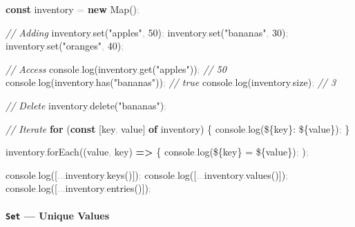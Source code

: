 \documentclass[
  justified,
  openright,
]{tufte-book}
\let\subsection\paragraph
\let\paragraph\paragraph
\newcommand{\KeywordTok}[1]{\textcolor{CodeKeyword}{\textbf{#1}}}  %
\newcommand{\StringTok}[1]{\textcolor{CodeString}{#1}}              %
\newcommand{\CommentTok}[1]{\textcolor{CodeComment}{\textit{#1}}}  %
\newcommand{\CodeNumTok}[1]{\textcolor{CodeNumber}{#1}}             %
\newcommand{\CodeFuncTok}[1]{\textcolor{CodeKeyword}{#1}}           %
\newcommand{\CodeTypeTok}[1]{\textcolor{CodeType}{#1}}              %
\newcommand{\OperatorTok}[1]{\textcolor{DarkGray}{#1}}              %
\newenvironment{Shaded}{%
  \begin{mdframed}[style=TufteCode]%
}{%
  \end{mdframed}%
}
\let\subsection\paragraph
\let\paragraph\paragraph
\begin{document}
\begin{Shaded}
\begin{Highlighting}[]
\KeywordTok{const} inventory \OperatorTok{=} \KeywordTok{new} Map()\OperatorTok{;}
 
\CommentTok{// Adding}
inventory\OperatorTok{.}\CodeFuncTok{set}(\StringTok{"apples"}\OperatorTok{,} \CodeNumTok{50})\OperatorTok{;}
inventory\OperatorTok{.}\CodeFuncTok{set}(\StringTok{"bananas"}\OperatorTok{,} \CodeNumTok{30})\OperatorTok{;}
inventory\OperatorTok{.}\CodeFuncTok{set}(\StringTok{"oranges"}\OperatorTok{,} \CodeNumTok{40})\OperatorTok{;}
 
\CommentTok{// Access}
console\OperatorTok{.}\CodeFuncTok{log}(inventory\OperatorTok{.}\CodeFuncTok{get}(\StringTok{"apples"}))\OperatorTok{;} \CommentTok{// 50}
console\OperatorTok{.}\CodeFuncTok{log}(inventory\OperatorTok{.}\CodeFuncTok{has}(\StringTok{"bananas"}))\OperatorTok{;} \CommentTok{// true}
console\OperatorTok{.}\CodeFuncTok{log}(inventory\OperatorTok{.}\CodeTypeTok{size})\OperatorTok{;} \CommentTok{// 3}
 
\CommentTok{// Delete}
inventory\OperatorTok{.}\CodeFuncTok{delete}(\StringTok{"bananas"})\OperatorTok{;}
 
\CommentTok{// Iterate}
\KeywordTok{for} (\KeywordTok{const} [key\OperatorTok{,} value] \KeywordTok{of} inventory) \{
  console\OperatorTok{.}\CodeFuncTok{log}(\StringTok{\textasciigrave{}}\StringTok{\$\{}key\StringTok{\}}\StringTok{: }\StringTok{\$\{}value\StringTok{\}}\StringTok{\textasciigrave{}})\OperatorTok{;}
\}
 
inventory\OperatorTok{.}\CodeFuncTok{forEach}((value\OperatorTok{,} key) \KeywordTok{=\textgreater{}} \{
  console\OperatorTok{.}\CodeFuncTok{log}(\StringTok{\textasciigrave{}}\StringTok{\$\{}key\StringTok{\}}\StringTok{ = }\StringTok{\$\{}value\StringTok{\}}\StringTok{\textasciigrave{}})\OperatorTok{;}
)\OperatorTok{;}
 
console\OperatorTok{.}\CodeFuncTok{log}([\OperatorTok{...}inventory\OperatorTok{.}\CodeFuncTok{keys}()])\OperatorTok{;}
console\OperatorTok{.}\CodeFuncTok{log}([\OperatorTok{...}inventory\OperatorTok{.}\CodeFuncTok{values}()])\OperatorTok{;}
console\OperatorTok{.}\CodeFuncTok{log}([\OperatorTok{...}inventory\OperatorTok{.}\CodeFuncTok{entries}()])\OperatorTok{;}
\end{Highlighting}
\end{Shaded}

\subsection{\texorpdfstring{\texttt{Set} --- Unique
Values}{Set --- Unique Values}}\label{set-unique-values}
\end{document}
